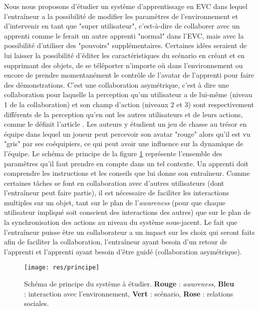 \documentclass[11pt]{article}
\begin{document}
Nous nous proposons d'étudier un système d'apprentissage en EVC dans lequel l'entraîneur a la possibilité de modifier les paramètres de l'environnement et d'intervenir en tant que "super utilisateur", c'est-à-dire de collaborer avec un apprenti comme le ferait un autre apprenti "normal" dans l'EVC, mais avec la possibilité d'utiliser des "pouvoirs" supplémentaires. Certaines idées seraient de lui laisser la possibilité d'éditer les caractéristiques du scénario en créant et en supprimant des objets, de se téléporter n'importe où dans l'environnement ou encore de prendre momentanément le contrôle de l'avatar de l'apprenti pour faire des démonstrations. C'est une collaboration asymétrique, c'est à dire une collaboration pour laquelle la perception qu'un utilisateur a de lui-même (niveau 1 de la collaboration) et son champ d'action (niveaux 2 et 3) sont respectivement différents de la perception qu'en ont les autres utilisateurs et de leurs actions, comme le définit l'article \cite{polly}. Les auteurs y étudient un jeu de chasse au trésor en équipe dans lequel un joueur peut percevoir son avatar "rouge" alors qu'il est vu "gris" par ses coéquipiers, ce qui peut avoir une influence sur la dynamique de l'équipe. Le schéma de principe de la figure \ref{fig:principle} représente l'ensemble des paramètres qu'il faut prendre en compte dans un tel contexte. Un apprenti doit comprendre les instructions et les conseils que lui donne son entraîneur. Comme certaines tâches se font en collaboration avec d'autres utilisateurs (dont l'entraîneur peut faire partie), il est nécessaire de faciliter les interactions multiples sur un objet, tant sur le plan de l'\textit{awareness} (pour que chaque utilisateur impliqué soit conscient des interactions des autres) que sur le plan de la synchronisation des actions au niveau du système sous-jacent. Le fait que l'entraîneur puisse être un collaborateur a un impact sur les choix qui seront faits afin de faciliter la collaboration, l'entraîneur ayant besoin d'un retour de l'apprenti et l'apprenti ayant besoin d'être guidé (collaboration asymétrique). 
\\

\begin{figure}[!h]
\centering
\texttt{[image: res/principe]}
\caption{\label{fig:principle}Schéma de principe du système à étudier. \textbf{Rouge} : \textit{awareness}, \textbf{Bleu} : interaction avec l'environnement, \textbf{Vert} : scénario, \textbf{Rose} : relations sociales.}
\end{figure}
\end{document}
